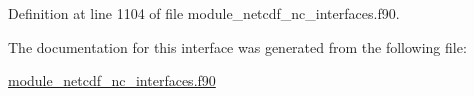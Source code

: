 Definition at line 1104 of file module\+\_\+netcdf\+\_\+nc\+\_\+interfaces.\+f90.



The documentation for this interface was generated from the following file\+:\begin{DoxyCompactItemize}
\item 
\hyperlink{module__netcdf__nc__interfaces_8f90}{module\+\_\+netcdf\+\_\+nc\+\_\+interfaces.\+f90}\end{DoxyCompactItemize}

